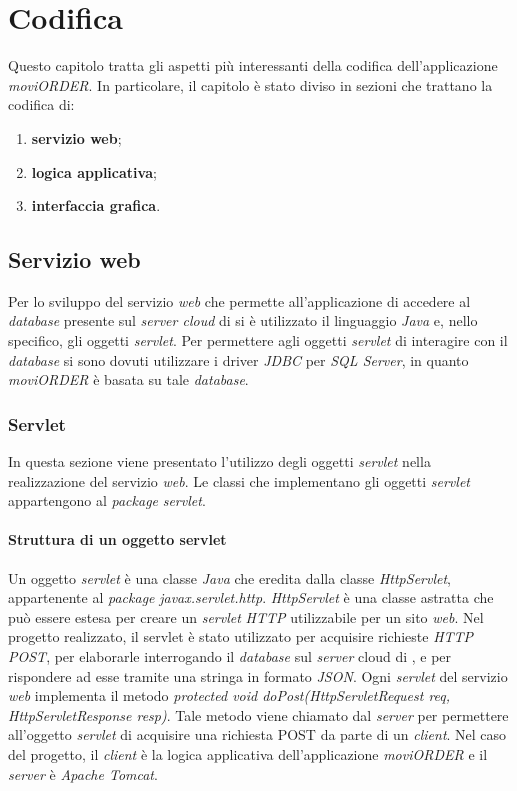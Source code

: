 \chapter{Codifica} \label{codifica}

Questo capitolo tratta gli aspetti più interessanti della codifica dell'applicazione \textit{moviORDER}. In particolare, il capitolo è stato diviso in sezioni che trattano la codifica di:
\begin{enumerate}
	\item \textbf{servizio web};
	\item \textbf{logica applicativa};
	\item \textbf{interfaccia grafica}.
\end{enumerate}

\section{Servizio web} \label{codificaservizio}

Per lo sviluppo del servizio \textit{web} che permette all'applicazione di accedere al \textit{database} presente sul \textit{server cloud} di \visione{} si è utilizzato il linguaggio \textit{Java} e, nello specifico, gli oggetti \textit{servlet}. Per permettere agli oggetti \textit{servlet} di interagire con il \textit{database} si sono dovuti utilizzare i driver \textit{JDBC} per \textit{SQL Server}, in quanto \textit{moviORDER} è basata su tale \textit{database}. 

\subsection{Servlet}

In questa sezione viene presentato l'utilizzo degli oggetti \textit{servlet} nella realizzazione del servizio \textit{web}. Le classi che implementano gli oggetti \textit{servlet} appartengono al \textit{package} \textit{servlet}.

\subsubsection{Struttura di un oggetto servlet}

Un oggetto \textit{servlet} è una classe \textit{Java} che eredita dalla classe \textit{HttpServlet}, appartenente al \textit{package} \textit{javax.servlet.http}. \textit{HttpServlet} è una classe astratta che può essere estesa per creare un \textit{servlet} \textit{HTTP} utilizzabile per un sito \textit{web}. Nel progetto realizzato, il servlet è stato utilizzato per acquisire richieste \textit{HTTP POST}, per elaborarle interrogando il \textit{database} sul \textit{server} cloud di \visione{}, e per rispondere ad esse tramite una stringa in formato \textit{JSON}. Ogni \textit{servlet} del servizio \textit{web} implementa il metodo \textit{protected void doPost(HttpServletRequest req, HttpServletResponse resp)}. Tale metodo viene chiamato dal \textit{server} per permettere all'oggetto \textit{servlet} di acquisire una richiesta POST da parte di un \textit{client}. Nel caso del progetto, il \textit{client} è la logica applicativa dell'applicazione \textit{moviORDER} e il \textit{server} è \textit{Apache Tomcat}.

